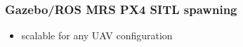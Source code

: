 \documentclass[aspectratio=169,9pt]{beamer}
\begin{document}
\begin{frame}
  \frametitle{Gazebo/ROS MRS PX4 SITL spawning}

  \begin{itemize}
    \item scalable for any UAV configuration
  \end{itemize}







\end{frame}


\end{document}
